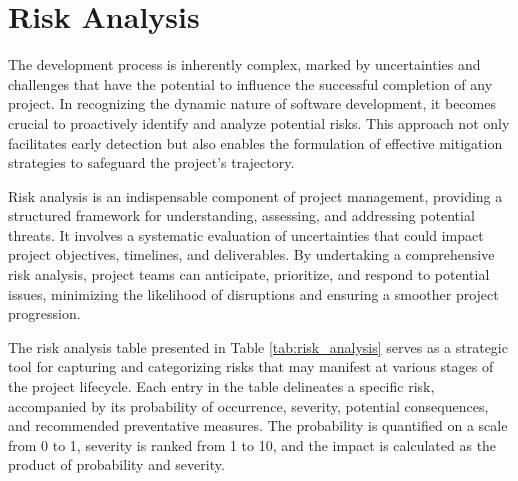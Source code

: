 \chapter{Risk Analysis}

The development process is inherently complex, marked by uncertainties and challenges that have the potential to influence the successful completion of any project. In recognizing the dynamic nature of software development, it becomes crucial to proactively identify and analyze potential risks. This approach not only facilitates early detection but also enables the formulation of effective mitigation strategies to safeguard the project's trajectory.

Risk analysis is an indispensable component of project management, providing a structured framework for understanding, assessing, and addressing potential threats. It involves a systematic evaluation of uncertainties that could impact project objectives, timelines, and deliverables. By undertaking a comprehensive risk analysis, project teams can anticipate, prioritize, and respond to potential issues, minimizing the likelihood of disruptions and ensuring a smoother project progression.

The risk analysis table presented in Table \ref{tab:risk_analysis} serves as a strategic tool for capturing and categorizing risks that may manifest at various stages of the project lifecycle. Each entry in the table delineates a specific risk, accompanied by its probability of occurrence, severity, potential consequences, and recommended preventative measures. The probability is quantified on a scale from 0 to 1, severity is ranked from 1 to 10, and the impact is calculated as the product of probability and severity.

